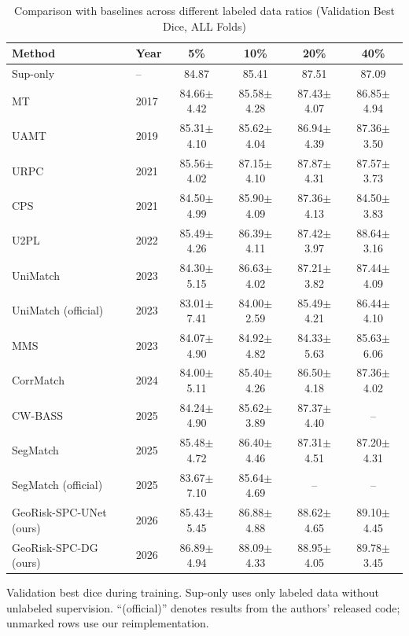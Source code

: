 \documentclass[conference]{IEEEtran}
\begin{document}
\begin{table}[htbp]
\caption{Comparison with baselines across different labeled data ratios (Validation Best Dice, ALL Folds)}
\begin{center}
\begin{tabular}{llcccc}
\toprule
Method & Year & 5\% & 10\% & 20\% & 40\% \\
\midrule
Sup-only & -- & 84.87 & 85.41 & 87.51 & 87.09 \\
MT \cite{tarvainen2017mean} & 2017 & 84.66{\tiny$\pm$4.42} & 85.58{\tiny$\pm$4.28} & 87.43{\tiny$\pm$4.07} & 86.85{\tiny$\pm$4.94} \\
UAMT \cite{yu2019uncertainty} & 2019 & 85.31{\tiny$\pm$4.10} & 85.62{\tiny$\pm$4.04} & 86.94{\tiny$\pm$4.39} & 87.36{\tiny$\pm$3.50} \\
URPC \cite{chen2021urpc} & 2021 & 85.56{\tiny$\pm$4.02} & 87.15{\tiny$\pm$4.10} & 87.87{\tiny$\pm$4.31} & 87.57{\tiny$\pm$3.73} \\
CPS \cite{chen2021cps} & 2021 & 84.50{\tiny$\pm$4.99} & 85.90{\tiny$\pm$4.09} & 87.36{\tiny$\pm$4.13} & 84.50{\tiny$\pm$3.83} \\
U2PL \cite{wang2022u2pl} & 2022 & 85.49{\tiny$\pm$4.26} & 86.39{\tiny$\pm$4.11} & 87.42{\tiny$\pm$3.97} & 88.64{\tiny$\pm$3.16} \\
UniMatch \cite{yang2023unimatch} & 2023 & 84.30{\tiny$\pm$5.15} & 86.63{\tiny$\pm$4.02} & 87.21{\tiny$\pm$3.82} & 87.44{\tiny$\pm$4.09} \\
UniMatch (official) & 2023 & 83.01{\tiny$\pm$7.41} & 84.00{\tiny$\pm$2.59} & 85.49{\tiny$\pm$4.21} & 86.44{\tiny$\pm$4.10} \\
MMS \cite{li2023minmax} & 2023 & 84.07{\tiny$\pm$4.90} & 84.92{\tiny$\pm$4.82} & 84.33{\tiny$\pm$5.63} & 85.63{\tiny$\pm$6.06} \\
CorrMatch \cite{sun2024corrmatch} & 2024 & 84.00{\tiny$\pm$5.11} & 85.40{\tiny$\pm$4.26} & 86.50{\tiny$\pm$4.18} & 87.36{\tiny$\pm$4.02} \\
CW-BASS \cite{cwbass2025} & 2025 & 84.24{\tiny$\pm$4.90} & 85.62{\tiny$\pm$3.89} & 87.37{\tiny$\pm$4.40} & -- \\
SegMatch \cite{segmatch2025} & 2025 & 85.48{\tiny$\pm$4.72} & 86.40{\tiny$\pm$4.46} & 87.31{\tiny$\pm$4.51} & 87.20{\tiny$\pm$4.31} \\
SegMatch (official) & 2025 & 83.67{\tiny$\pm$7.10} & 85.64{\tiny$\pm$4.69} & -- & -- \\
\midrule
GeoRisk-SPC-UNet (ours) & 2026 & 85.43{\tiny$\pm$5.45} & 86.88{\tiny$\pm$4.88} & 88.62{\tiny$\pm$4.65} & 89.10{\tiny$\pm$4.45} \\
GeoRisk-SPC-DG (ours) & 2026 & 86.89{\tiny$\pm$4.94} & 88.09{\tiny$\pm$4.33} & 88.95{\tiny$\pm$4.05} & 89.78{\tiny$\pm$3.45} \\
\bottomrule
\end{tabular}
\end{center}
\label{tab:main_results}
{\footnotesize Validation best dice during training. Sup-only uses only labeled data without unlabeled supervision. ``(official)'' denotes results from the authors' released code; unmarked rows use our reimplementation.}
\end{table}
\end{document}
